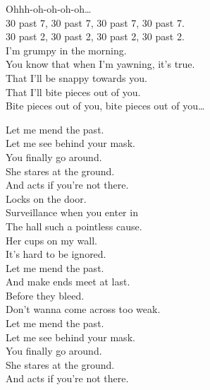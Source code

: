 Ohhh-oh-oh-oh-oh… \\

30 past 7, 30 past 7, 30 past 7, 30 past 7. \\
30 past 2, 30 past 2, 30 past 2, 30 past 2. \\
I'm grumpy in the morning. \\
You know that when I'm yawning, it's true. \\

That I'll be snappy towards you. \\
That I'll bite pieces out of you. \\

Bite pieces out of you, bite pieces out of you… \\





Let me mend the past. \\
Let me see behind your mask. \\
You finally go around. \\
She stares at the ground. \\
And acts if you're not there. \\

Locks on the door. \\
Surveillance when you enter in \\
The hall such a pointless cause. \\
Her cups on my wall. \\
It's hard to be ignored. \\

Let me mend the past. \\
And make ends meet at last. \\
Before they bleed. \\
Don't wanna come across too weak. \\

Let me mend the past. \\
Let me see behind your mask. \\
You finally go around. \\
She stares at the ground. \\
And acts if you're not there. \\

